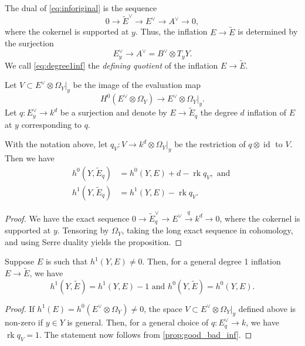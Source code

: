\documentclass[11 pt]{amsart}
\DeclareMathOperator{\id}{id}
\providecommand {\from}{{\colon}}
\providecommand{\rk}{\operatorname{rk}}
\numberwithin{equation}{section}
\begin{document}
The dual of \eqref{eq:inforiginal} is the sequence
\[ 0 \to \widetilde E ^\vee \to E^\vee \to A^\vee \to 0,\]
where the cokernel is supported at $y$.
Thus, the inflation $E \to \widetilde E$ is determined by the surjection
\begin{equation}\label{eq:degree1inf}
  E^\vee_y \to A^\vee = B^\vee \otimes T_yY.
\end{equation}
We call \eqref{eq:degree1inf} the \emph{defining quotient} of the inflation $E \to \widetilde E$.

Let $V \subset E^\vee \otimes \Omega_Y|_y$ be the image of the evaluation map
\[ H^0\left(E^\vee \otimes \Omega_Y\right) \to E^\vee \otimes \Omega_Y|_y.\]
Let $q \from E^\vee_y \to k^d$ be a surjection and denote by $E \to \widetilde E_q$ the degree $d$ inflation of $E$ at $y$ corresponding to $q$.
\begin{proposition}\label{prop:good_bad_inf}
  With the notation above, let $q_V \from V \to k^d \otimes \Omega_Y|_y$ be the restriction of $q \otimes \id$ to $V$.
  Then we have
  \begin{align*}
    h^0(Y, \widetilde E_q) &= h^0(Y, E) + d - \rk q_V, \text{ and }\\
    h^1(Y, \widetilde E_q) &= h^1(Y, E) - \rk q_V.
  \end{align*}
\end{proposition}
\begin{proof}
  We have the exact sequence $0 \to \widetilde E_q^\vee \to E^\vee \xrightarrow{q} k^d \to 0$, where the cokernel is supported at $y$.
  Tensoring by $\Omega_Y$, taking the long exact sequence in cohomology, and using Serre duality yields the proposition.
\end{proof}

\begin{proposition}
  \label{prop:inf_1}
  Suppose $E$ is such that $h^1(Y, E) \neq 0$.
  Then, for a general degree 1 inflation $E \to \widetilde E$, we have
  \[ h^1(Y, \widetilde E) = h^1(Y, E) - 1 \text{ and } h^0(Y, \widetilde E) = h^0(Y, E).\]
\end{proposition}
\begin{proof}
  If $h^1(E) = h^0(E^\vee \otimes \Omega_Y) \neq 0$, the space $V \subset E^\vee \otimes \Omega_Y|_y$ defined above is non-zero if $y \in Y$ is general.
  Then, for a general choice of $q \from E^\vee_q \to k$, we have $\rk q_V = 1$.
  The statement now follows from \autoref{prop:good_bad_inf}.
\end{proof}
\end{document}
